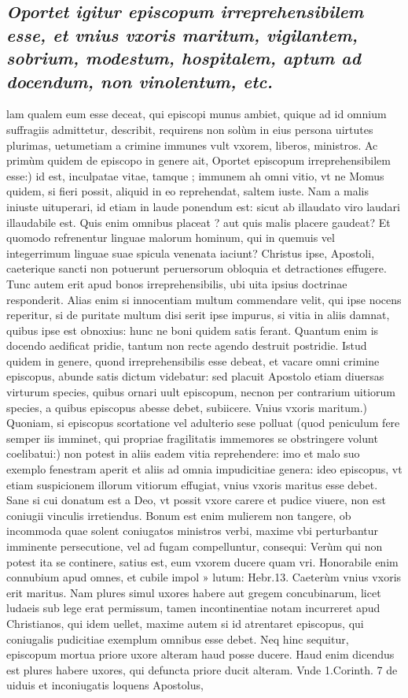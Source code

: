 \documentclass{article}
\begin{document}
\begin{pages}
\subsection*{\textit{Oportet igitur episcopum irreprehensibilem esse, et vnius vxoris maritum, vigilantem, sobrium, modestum, hospitalem, aptum ad docendum, non vinolentum, etc. }}\pstart lam qualem eum esse deceat, qui episcopi munus ambiet, quique ad id omnium suffragiis admittetur, describit, requirens non solùm in eius persona uirtutes plurimas, uetumetiam a crimine immunes vult vxorem, liberos, ministros. Ac primùm quidem de episcopo in genere ait,  \pend\pstart Oportet episcopum irreprehensibilem esse:) id est, inculpatae vitae, tamque ; immunem ah omni vitio, vt ne Momus quidem, si fieri possit, aliquid in eo reprehendat, saltem iuste. Nam a malis iniuste uituperari, id etiam in laude ponendum est: sicut ab illaudato viro laudari illaudabile est. Quis enim omnibus placeat ? aut quis malis placere gaudeat? Et quomodo refrenentur linguae malorum hominum, qui in quemuis vel integerrimum linguae suae spicula venenata iaciunt? Christus ipse, Apostoli, caeterique sancti non potuerunt peruersorum obloquia et detractiones effugere. Tunc autem erit apud bonos irreprehensibilis, ubi uita ipsius doctrinae responderit. Alias enim si innocentiam multum commendare velit, qui ipse nocens reperitur, si de puritate multum disi serit ipse impurus, si vitia in aliis damnat, quibus ipse est obnoxius: hunc ne boni quidem satis ferant. Quantum enim is docendo aedificat pridie, tantum non recte agendo destruit postridie. Istud quidem in genere, quond irreprehensibilis esse debeat, et vacare omni crimine episcopus, abunde satis dictum videbatur: sed placuit Apostolo etiam diuersas virturum species, quibus ornari uult episcopum, necnon per contrarium uitiorum species, a quibus episcopus abesse debet, subiicere.  \pend\pstart Vnius vxoris maritum.) Quoniam, si episcopus scortatione vel adulterio sese polluat (quod peniculum fere semper iis imminet, qui propriae fragilitatis immemores se obstringere volunt coelibatui:) non potest in aliis eadem vitia reprehendere: imo et malo suo exemplo fenestram aperit et aliis ad omnia impudicitiae genera: ideo episcopus, vt etiam suspicionem illorum vitiorum effugiat, vnius vxoris maritus esse debet. Sane si cui donatum est a Deo, vt possit vxore carere et pudice viuere, non est coniugii vinculis irretiendus. Bonum est enim mulierem non tangere, ob incommoda quae solent coniugatos ministros verbi, maxime vbi perturbantur imminente persecutione, vel ad fugam compelluntur, consequi: Verùm qui non potest ita se continere, satius est, eum vxorem ducere quam vri. Honorabile enim connubium apud omnes, et cubile impol » lutum: Hebr.13. Caeterùm vnius vxoris erit maritus. Nam plures simul uxores habere aut gregem concubinarum, licet ludaeis sub lege erat permissum, tamen incontinentiae notam incurreret apud Christianos, qui idem uellet, maxime autem si id atrentaret episcopus, qui coniugalis pudicitiae exemplum omnibus esse debet. Neq hinc sequitur, episcopum mortua priore uxore alteram haud posse ducere. Haud enim dicendus est plures habere uxores, qui defuncta priore ducit alteram. Vnde 1.Corinth. 7 de uiduis et inconiugatis loquens Apostolus, 
\end{pages}
\end{document}
